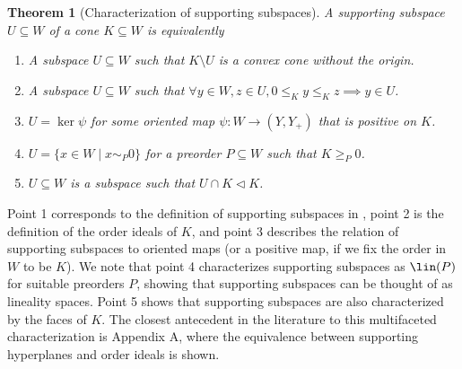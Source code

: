 \documentclass{article}
\theoremstyle{plain}
\newtheorem{theorem}{Theorem}[section]
\theoremstyle{definition}
\theoremstyle{remark}
\begin{document}
\begin{theorem}[Characterization of supporting subspaces]
\label{loc:characterization_of_supporting_subspaces.statement}
A supporting subspace $U \subseteq W$ of a cone $K \subseteq W$ is equivalently
\begin{enumerate}
\item A subspace $U \subseteq W$ such that $K \setminus U$ is a convex cone without the origin.
\item A subspace $U \subseteq W$ such that $\forall y \in W, z \in U, 0 \le_{K} y \le_{K} z  \implies y \in U$. 
\item $U=\ker \psi$ for some oriented map $\psi:W \to (Y, Y_+)$ that is positive on $K$.
\item $U = \{ x  \in W \mid x \sim_{P} 0\}$ for a preorder $P \subseteq W$ such that $K \geq_{P} 0$.
\item $U \subseteq W$ is a subspace such that $U \cap K \triangleleft K$.
\end{enumerate}
\end{theorem}
Point 1 corresponds to the definition of supporting subspaces in \cite{scottBilateralFacialReduction2026}, point 2 is the definition of the order ideals of $K$, and point 3 describes the relation of supporting subspaces to oriented maps (or a positive map, if we fix the order in $W$ to be $K$). We note that point 4 characterizes supporting subspaces as $\lin(P)$ for suitable preorders $P$, showing that supporting subspaces can be thought of as lineality spaces.
Point 5 shows that supporting subspaces are also characterized by the faces of $K$. The closest antecedent in the literature to this multifaceted characterization is \cite{bruynTensorProductsConvex2020} Appendix A, where the equivalence between supporting hyperplanes and order ideals is shown.
\end{document}
